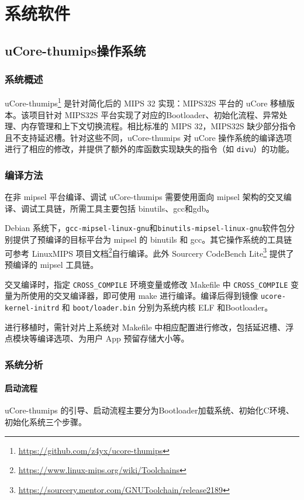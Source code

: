 \chapter{系统软件}


\section{uCore-thumips操作系统}
\label{section:ucore-thumips}
\subsection{系统概述}

uCore-thumips\footnote{\url{https://github.com/z4yx/ucore-thumips}} 是针对简化后的 MIPS 32 实现：MIPS32S 平台的 uCore 移植版本。该项目针对 MIPS32S 平台实现了对应的Bootloader、初始化流程、异常处理、内存管理和上下文切换流程。相比标准的 MIPS 32，MIPS32S 缺少部分指令且不支持延迟槽。针对这些不同，uCore-thumips 对 uCore 操作系统的编译选项进行了相应的修改，并提供了额外的库函数实现缺失的指令（如 \texttt{divu}）的功能。

\subsection{编译方法}
在非 mipsel 平台编译、调试 uCore-thumips 需要使用面向 mipsel 架构的交叉编译、调试工具链，所需工具主要包括 binutils、gcc和gdb。

Debian 系统下，\texttt{gcc-mipsel-linux-gnu}和\texttt{binutils-mipsel-linux-gnu}软件包分别提供了预编译的目标平台为 mipsel 的 binutils 和 gcc。其它操作系统的工具链可参考 LinuxMIPS 项目文档\footnote{\url{https://www.linux-mips.org/wiki/Toolchains}}自行编译。此外 Sourcery CodeBench Lite\footnote{\url{https://sourcery.mentor.com/GNUToolchain/release2189}} 提供了预编译的 mipsel 工具链。 

交叉编译时，指定 \texttt{CROSS\_COMPILE} 环境变量或修改 Makefile 中 \texttt{CROSS\_COMPILE} 变量为所使用的交叉编译器，即可使用 make 进行编译。编译后得到镜像 \texttt{ucore-kernel-initrd} 和 \texttt{boot/loader.bin} 分别为系统内核 ELF 和Bootloader。

进行移植时，需针对片上系统对 Makefile 中相应配置进行修改，包括延迟槽、浮点模块等编译选项、为用户 App 预留存储大小等。

\subsection{系统分析}

\subsubsection{启动流程}
uCore-thumips 的引导、启动流程主要分为Bootloader加载系统、初始化C环境、初始化系统三个步骤。

